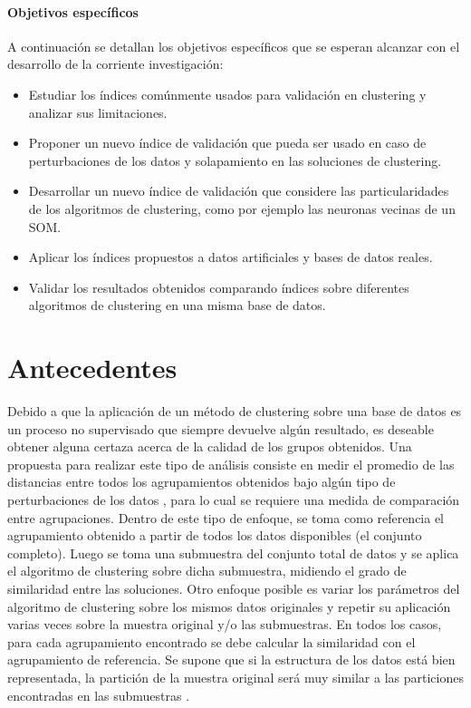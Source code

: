 \documentclass[a4paper,8pt]{article}
\begin{document}
\paragraph{Objetivos específicos\\[2mm]}
A continuación se detallan los objetivos específicos que se esperan alcanzar con el desarrollo de la
corriente investigación:
\begin{itemize}
	\item Estudiar los \'indices com\'unmente usados para validaci\'on en clustering y analizar sus limitaciones.
	\item Proponer un nuevo \'indice de validaci\'on que pueda ser usado en caso de perturbaciones de los datos y solapamiento en las soluciones de clustering.
	\item Desarrollar un nuevo \'indice de validaci\'on que considere las particularidades de los algoritmos de clustering, como por ejemplo las neuronas vecinas de un SOM.
	\item Aplicar los \'indices propuestos a datos artificiales y bases de datos reales.
	\item Validar los resultados obtenidos comparando índices sobre diferentes algoritmos de clustering en una misma base de datos.
\end{itemize}

\section{Antecedentes}
Debido a que la aplicación de un método de clustering sobre una base de datos es un proceso no supervisado que siempre devuelve algún resultado, es deseable obtener alguna certaza acerca de la calidad de los grupos obtenidos.
Una propuesta para realizar este tipo de análisis consiste en medir el promedio de las distancias entre todos los agrupamientos obtenidos bajo algún tipo de perturbaciones de los datos \cite{NguyenEB09}, para lo cual se requiere una medida de comparación entre agrupaciones. Dentro de este tipo de enfoque, se toma como referencia el agrupamiento obtenido a partir de todos los datos disponibles (el conjunto completo). Luego se toma una submuestra del conjunto total de datos y se aplica el algoritmo de clustering sobre dicha submuestra, midiendo el grado de similaridad entre las soluciones. Otro enfoque posible es variar los parámetros del algoritmo de clustering sobre los mismos datos originales y repetir su aplicación varias veces sobre la muestra original y/o las submuestras. En todos los casos, para cada agrupamiento encontrado se debe calcular la similaridad con el agrupamiento de referencia. Se supone que si la estructura de los datos está bien representada, la partición de la muestra original será muy similar a las particiones encontradas en las submuestras \cite{NguyenEB10}.
\end{document}

